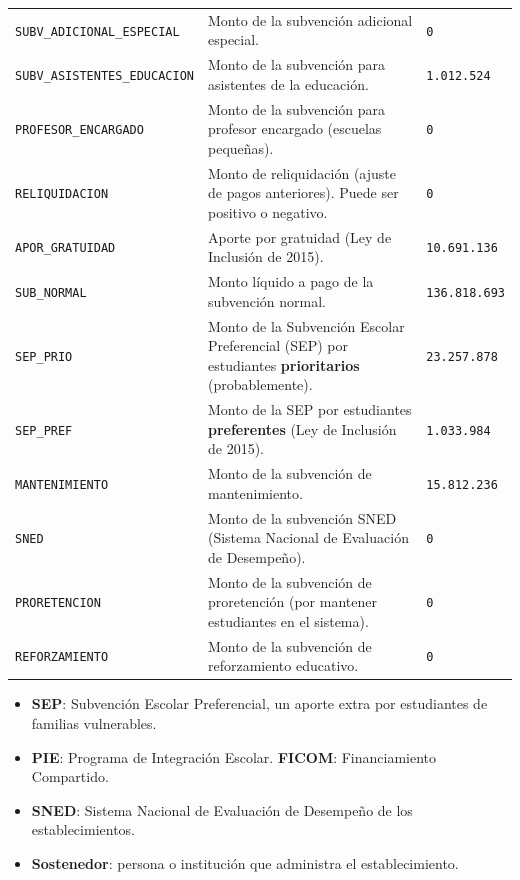 \documentclass[10.5pt]{article}
\begin{document}
\begin{xltabular}{\linewidth}{@{}p{4.5cm} >{\raggedright\arraybackslash}X p{3.4cm}@{}}
\texttt{SUBV\_\allowbreak{}ADICIONAL\_\allowbreak{}ESPECIAL} & Monto de la subvención adicional especial. & \texttt{0} \\
\texttt{SUBV\_\allowbreak{}ASISTENTES\_\allowbreak{}EDUCACION} & Monto de la subvención para asistentes de la educación. & \texttt{1.012.524} \\
\texttt{PROFESOR\_\allowbreak{}ENCARGADO} & Monto de la subvención para profesor encargado (escuelas pequeñas). & \texttt{0} \\
\texttt{RELIQUIDACION} & Monto de reliquidación (ajuste de pagos anteriores). Puede ser positivo o negativo. & \texttt{0} \\
\texttt{APOR\_\allowbreak{}GRATUIDAD} & Aporte por gratuidad (Ley de Inclusión de 2015). & \texttt{10.691.136} \\
\texttt{SUB\_\allowbreak{}NORMAL} & Monto líquido a pago de la subvención normal. & \texttt{136.818.693} \\
\texttt{SEP\_\allowbreak{}PRIO} & Monto de la Subvención Escolar Preferencial (SEP) por estudiantes \textbf{prioritarios} (probablemente). & \texttt{23.257.878} \\
\texttt{SEP\_\allowbreak{}PREF} & Monto de la SEP por estudiantes \textbf{preferentes} (Ley de Inclusión de 2015). & \texttt{1.033.984} \\
\texttt{MANTENIMIENTO} & Monto de la subvención de mantenimiento. & \texttt{15.812.236} \\
\texttt{SNED} & Monto de la subvención SNED (Sistema Nacional de Evaluación de Desempeño). & \texttt{0} \\
\texttt{PRORETENCION} & Monto de la subvención de proretención (por mantener estudiantes en el sistema). & \texttt{0} \\
\texttt{REFORZAMIENTO} & Monto de la subvención de reforzamiento educativo. & \texttt{0} \\
\end{xltabular}

\begin{formulabox}
\begin{itemize}[leftmargin=1.1em,itemsep=2pt,topsep=2pt]
\item \textbf{SEP}: Subvención Escolar Preferencial, un aporte extra por estudiantes de familias vulnerables.
\item \textbf{PIE}: Programa de Integración Escolar.  \textbf{FICOM}: Financiamiento Compartido.
\item \textbf{SNED}: Sistema Nacional de Evaluación de Desempeño de los establecimientos.
\item \textbf{Sostenedor}: persona o institución que administra el establecimiento.
\end{itemize}
\end{formulabox}
\end{document}
